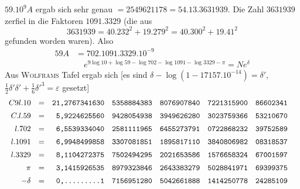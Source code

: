 $59.10^9A$ ergab sich sehr genau $=2549621178=54.13.3631939$. Die Zahl
$3631939$ zerfiel in die Faktoren $1091.3329$ (die aus
\[
3631939=40.232^2+19.279^2=40.300^2+19.41^2
\]
gefunden worden waren). Also
\[
\begin{aligned}59A&=702.1091.3329.10^{-9}\\[7pt]&\quad{}e^{9\log10+\log59-\log702-\log1091-\log3329-\pi}=Ne^\delta\end{aligned}
\]
Aus \textsc{Wolframs} Tafel ergab sich [es sind $\delta-\log(1-17157.10^{-14})=\delta'$,
$\frac12\delta'\delta'+\frac16\delta'^3=\varepsilon$ gesetzt]
\begingroup\footnotesize\setlength{\arraycolsep}{1pt}\renewcommand{\arraystretch}{1.12}\[
\begin{array}{rcrlllll}
C9l.10&=&\text{\ttfamily 21,2767341630}&\text{\ttfamily 5358884383}&\text{\ttfamily 8076907840}&\text{\ttfamily 7221315900}&\text{\ttfamily 86602341}&\\[5pt]
C.l.59&=&\text{\ttfamily 5,9224625560}&\text{\ttfamily 9428054938}&\text{\ttfamily 3949626280}&\text{\ttfamily 3023759366}&\text{\ttfamily 53210670}&\\[5pt]
l.702&=&\text{\ttfamily 6,5539334040}&\text{\ttfamily 2581111965}&\text{\ttfamily 6455273791}&\text{\ttfamily 0722868232}&\text{\ttfamily 39752589}&\\[5pt]
l.1091&=&\text{\ttfamily 6,9948499858}&\text{\ttfamily 3307081851}&\text{\ttfamily 1895817110}&\text{\ttfamily 3840806982}&\text{\ttfamily 08318537}&\\[5pt]
l.3329&=&\text{\ttfamily 8,1104272375}&\text{\ttfamily 7502494295}&\text{\ttfamily 2021653586}&\text{\ttfamily 1576658324}&\text{\ttfamily 67001597}&\\[5pt]
\pi&=&\text{\ttfamily 3,1415926535}&\text{\ttfamily 8979323846}&\text{\ttfamily 2643383279}&\text{\ttfamily 5028841971}&\text{\ttfamily 69399375}&\\[5pt]
-\delta&=&\text{\ttfamily 0,.........1}&\text{\ttfamily 7156951280}&\text{\ttfamily 5042661888}&\text{\ttfamily 1414250778}&\text{\ttfamily 24285109}&\\[5pt]

\end{array}\]
